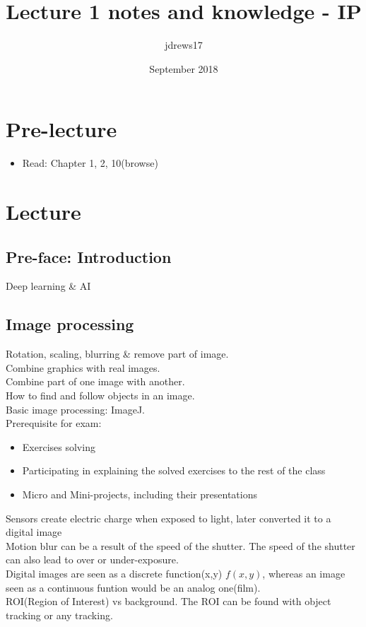 \documentclass{article}
\title{Lecture 1 notes and knowledge - IP}
\author{jdrews17}
\date{September 2018}
\begin{document}
\maketitle
\newpage

\section{Pre-lecture}
\begin{itemize}
  \item Read: Chapter 1, 2, 10(browse)
\end{itemize}

\section{Lecture}
\subsection{Pre-face: Introduction}
Deep learning \& AI\\

\subsection{Image processing}
Rotation, scaling, blurring \& remove part of image.\\
Combine graphics with real images.\\
Combine part of one image with another.\\
How to find and follow objects in an image.\medskip \\
Basic image processing: ImageJ.\\
Prerequisite for exam:\\
\begin{itemize}
  \item Exercises solving
  \item Participating in explaining the solved exercises to the rest of the class
  \item Micro and Mini-projects, including their presentations
\end{itemize}
Sensors create electric charge when exposed to light, later converted it to a digital image\\
Motion blur can be a result of the speed of the shutter. The speed of the shutter can also lead to over or under-exposure.\\
Digital images are seen as a discrete function(x,y) $f(x,y)$, whereas an image seen as a continuous funtion would be an analog one(film).\\
ROI(Region of Interest) vs background. The ROI can be found with object tracking or any tracking.
\end{document}
